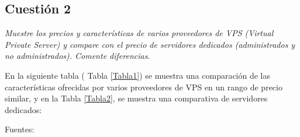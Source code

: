 \subsection{Cuestión 2}
\textit{Muestre los precios y características de varios proveedores de VPS (Virtual Private Server) y compare con el precio de servidores dedicados (administrados y no administrados). Comente diferencias}. \newline

En la siguiente tabla ( Tabla \ref{Tabla1}) se muestra una comparación de las características ofrecidas por varios proveedores de VPS en un rango de precio similar, y en la Tabla \ref{Tabla2}, se muestra una comparativa de servidores dedicados:
\newpage

\begin{table}[h]

\caption{Comparativa proveedores VPS }
\advance\leftskip 5cm
Fuentes: \cite{vps1} \cite{vps2} \cite{vps3} \cite{vps4}
\label{Tabla1}
\end{table}


